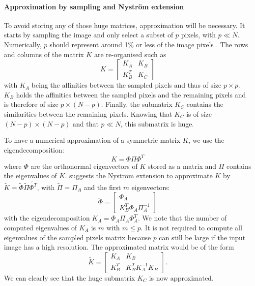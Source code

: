 \paragraph{Approximation by sampling and Nystr\"om extension}

To avoid storing any of those huge matrices, approximation will be necessary.
It starts by sampling the image and only select a subset of \(p\) pixels, with \(p \ll N\).
Numerically, \(p\) should represent around 1\% or less of the image pixels \cite{fowlkes_spectral_2004}.
The rows and columns of the matrix \(K\) are re-organised such as
\[K = \begin{bmatrix}K_A & K_B \\ K_B^T & K_C\end{bmatrix}\]
with \(K_A\) being the affinities between the sampled pixels and thus of size \(p \times p\).
\(K_B\) holds the affinities between the sampled pixels and the remaining pixels and is therefore of size \(p \times (N-p)\).
Finally, the submatrix \(K_C\) contains the similarities between the remaining pixels.
Knowing that \(K_C\) is of size \((N-p) \times (N-p)\) and that \(p \ll N\), this submatrix is huge.

To have a numerical approximation of a symmetric matrix \(K\), we use the eigendecomposition:
\[K = \Phi \Pi \Phi^T\]
where \(\Phi\) are the orthonormal eigenvectors of \(K\) stored as a matrix and \(\Pi\) contains the eigenvalues of \(K\).
\cite{fowlkes_spectral_2004} suggests the Nystr\"om extension to approximate \(K\) by \(\tilde{K} = \tilde{\Phi} \tilde{\Pi} \tilde{\Phi^T}\), with \(\tilde{\Pi} = \Pi_A\) and the first \(m\) eigenvectors:
\[\tilde{\Phi} = \begin{bmatrix}\Phi_A \\ K_B^T \Phi_A \Pi_A^{-1}\end{bmatrix}\]
with the eigendecomposition \(K_A = \Phi_A \Pi_A \Phi_A^T\).
We note that the number of computed eigenvalues of \(K_A\) is \(m\) with \(m \le p\).
It is not required to compute all eigenvalues of the sampled pixels matrix because \(p\) can still be large if the input image has a high resolution.
The approximated matrix would be of the form \cite{glide_2014}
\[\tilde{K} = \begin{bmatrix}K_A & K_B \\ K_B^T & K_B^T K_A^{-1} K_B\end{bmatrix}.\]
We can clearly see that the huge submatrix \(K_C\) is now approximated.

